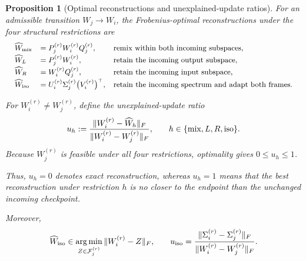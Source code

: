 \documentclass[11pt, a4paper]{utda}
\theoremstyle{plain}
\newtheorem{proposition}[theorem]{Proposition}
\theoremstyle{definition}
\theoremstyle{remark}
\begin{document}
\begin{proposition}[Optimal reconstructions and unexplained-update ratios]
\label{prop:checkpoint_transport_test}
For an admissible transition $W_j\rightarrow W_i$, the Frobenius-optimal
reconstructions under the four structural restrictions are
\begin{equation}
\label{eq:transport_reconstructions}
\small
\begin{array}{lll}
\widehat W_{\mathrm{mix}}
&=
P_j^{(r)}W_i^{(r)}Q_j^{(r)},
&\text{remix within both incoming subspaces},\\[2pt]
\widehat W_L
&=
P_j^{(r)}W_i^{(r)},
&\text{retain the incoming output subspace},\\[2pt]
\widehat W_R
&=
W_i^{(r)}Q_j^{(r)},
&\text{retain the incoming input subspace},\\[2pt]
\widehat W_{\mathrm{iso}}
&=
U_i^{(r)}
\Sigma_j^{(r)}
\bigl(V_i^{(r)}\bigr)^\top,
&\text{retain the incoming spectrum and adapt both frames}.
\end{array}
\end{equation}

For
$W_i^{(r)}\neq W_j^{(r)}$, define the
\emph{unexplained-update ratio}
\begin{equation}
\label{eq:unexplained_update_ratio}
\small
    u_h
    :=
    \frac{
        \|W_i^{(r)}-\widehat W_h\|_F
    }{
        \|W_i^{(r)}-W_j^{(r)}\|_F
    },
    \qquad
    h\in\{\mathrm{mix},L,R,\mathrm{iso}\}.
\end{equation}
Because $W_j^{(r)}$ is feasible under all four restrictions, optimality gives
$0\leq u_h\leq1$.

Thus, $u_h=0$ denotes exact reconstruction, whereas $u_h=1$ means that the
best reconstruction under restriction $h$ is no closer to the endpoint than
the unchanged incoming checkpoint.

Moreover,
\begin{equation}
\label{eq:iso_transport_residual}
\small
    \widehat W_{\mathrm{iso}}
    \in
    \operatorname*{arg\,min}_{Z\in\mathcal F_j^{(r)}}
    \|W_i^{(r)}-Z\|_F,
    \qquad
    u_{\mathrm{iso}}
    =
    \frac{
        \|\Sigma_i^{(r)}-\Sigma_j^{(r)}\|_F
    }{
        \|W_i^{(r)}-W_j^{(r)}\|_F
    }.
\end{equation}
\end{proposition}
\end{document}
